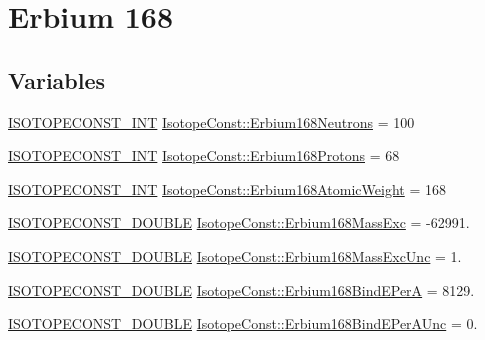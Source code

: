 \hypertarget{group___isotope_const-_erbium-_er168}{}\section{Erbium 168}
\label{group___isotope_const-_erbium-_er168}
\subsection*{Variables}
\begin{DoxyCompactItemize}
\item 
\mbox{\hyperlink{group___isotope_const-_macros_ga5f18360b3e99483a35c32d789e62621c}{I\+S\+O\+T\+O\+P\+E\+C\+O\+N\+S\+T\+\_\+\+I\+NT}} \mbox{\hyperlink{group___isotope_const-_erbium-_er168_ga1fe7f6a7ffdaa068e3ec6377a26f6599}{Isotope\+Const\+::\+Erbium168\+Neutrons}} = 100
\item 
\mbox{\hyperlink{group___isotope_const-_macros_ga5f18360b3e99483a35c32d789e62621c}{I\+S\+O\+T\+O\+P\+E\+C\+O\+N\+S\+T\+\_\+\+I\+NT}} \mbox{\hyperlink{group___isotope_const-_erbium-_er168_ga01b7894445ba2b49ffcc58c525d5a38a}{Isotope\+Const\+::\+Erbium168\+Protons}} = 68
\item 
\mbox{\hyperlink{group___isotope_const-_macros_ga5f18360b3e99483a35c32d789e62621c}{I\+S\+O\+T\+O\+P\+E\+C\+O\+N\+S\+T\+\_\+\+I\+NT}} \mbox{\hyperlink{group___isotope_const-_erbium-_er168_ga3008d3c58573950dd4e5c1f224ee0d87}{Isotope\+Const\+::\+Erbium168\+Atomic\+Weight}} = 168
\item 
\mbox{\hyperlink{group___isotope_const-_macros_ga8f45a7272ce02c0b4c65c44636ed719a}{I\+S\+O\+T\+O\+P\+E\+C\+O\+N\+S\+T\+\_\+\+D\+O\+U\+B\+LE}} \mbox{\hyperlink{group___isotope_const-_erbium-_er168_gabd1a58198f4ecb49cb18844de8701a07}{Isotope\+Const\+::\+Erbium168\+Mass\+Exc}} = -\/62991.
\item 
\mbox{\hyperlink{group___isotope_const-_macros_ga8f45a7272ce02c0b4c65c44636ed719a}{I\+S\+O\+T\+O\+P\+E\+C\+O\+N\+S\+T\+\_\+\+D\+O\+U\+B\+LE}} \mbox{\hyperlink{group___isotope_const-_erbium-_er168_ga54f88c764cec3b32b38125db8c7d9d4e}{Isotope\+Const\+::\+Erbium168\+Mass\+Exc\+Unc}} = 1.
\item 
\mbox{\hyperlink{group___isotope_const-_macros_ga8f45a7272ce02c0b4c65c44636ed719a}{I\+S\+O\+T\+O\+P\+E\+C\+O\+N\+S\+T\+\_\+\+D\+O\+U\+B\+LE}} \mbox{\hyperlink{group___isotope_const-_erbium-_er168_ga1c39fa245152a5c83a30660c346246e5}{Isotope\+Const\+::\+Erbium168\+Bind\+E\+PerA}} = 8129.
\item 
\mbox{\hyperlink{group___isotope_const-_macros_ga8f45a7272ce02c0b4c65c44636ed719a}{I\+S\+O\+T\+O\+P\+E\+C\+O\+N\+S\+T\+\_\+\+D\+O\+U\+B\+LE}} \mbox{\hyperlink{group___isotope_const-_erbium-_er168_ga0f6af5957fd398835fe641407f7eb10f}{Isotope\+Const\+::\+Erbium168\+Bind\+E\+Per\+A\+Unc}} = 0.

\end{DoxyCompactItemize}
